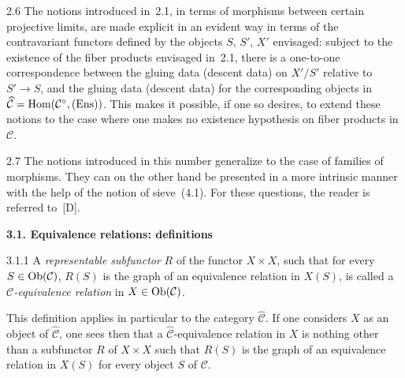 \begin{remark}{2.6}
\label{IV.2.6}
The notions introduced in~2.1, in terms of morphisms between certain
projective limits, are made explicit in an evident way in terms of the
contravariant functors defined by the objects \(S\), \(S'\), \(X'\)
envisaged: subject to the existence of the fiber products envisaged
in~2.1, there is a one-to-one correspondence between the gluing data
(\resp descent data) on \(X'/S'\) relative to \(S'\to S\), and the gluing
data (\resp descent data) for the corresponding objects in
\(\widehat{\mathcal{C}}=\operatorname{Hom}(\mathcal{C}^{\circ},\textup{(Ens)})\). This makes it
possible, if one so desires, to extend these notions to the case where one
makes no existence hypothesis on fiber products in \(\mathcal{C}\).
\end{remark}

\begin{remark}{2.7}
\label{IV.2.7}
The notions introduced in this number generalize to the case of families of
morphisms. They can on the other hand be presented in a more intrinsic
manner with the help of the notion of sieve~(4.1). For these questions, the
reader is referred to~[D].
\end{remark}

\label{IV.sec.3}

\par{}
\noindent\textbf{3.1. Equivalence relations: definitions}\label{IV.sec.3.1}
\par{}

\begin{definition}{3.1.1}
\label{IV.3.1.1}
A \emph{representable subfunctor} \(R\) of the functor \(X\times X\), such
that for every \(S\in\operatorname{Ob}(\mathcal{C})\), \(R(S)\) is the graph of an
equivalence relation in \(X(S)\), is called a
\emph{\(\mathcal{C}\)-equivalence relation} in \(X\in\operatorname{Ob}(\mathcal{C})\).
\end{definition}

This definition applies in particular to the category
\(\widehat{\mathcal{C}}\). If one considers \(X\) as an object of
\(\widehat{\mathcal{C}}\), one sees then that a
\(\widehat{\mathcal{C}}\)-equivalence relation in \(X\) is nothing other
than a subfunctor \(R\) of \(X\times X\) such that \(R(S)\) is the graph of
an equivalence relation in \(X(S)\) for every object \(S\) of
\(\mathcal{C}\).%
{\renewcommand{\thefootnote}{(10)}}


